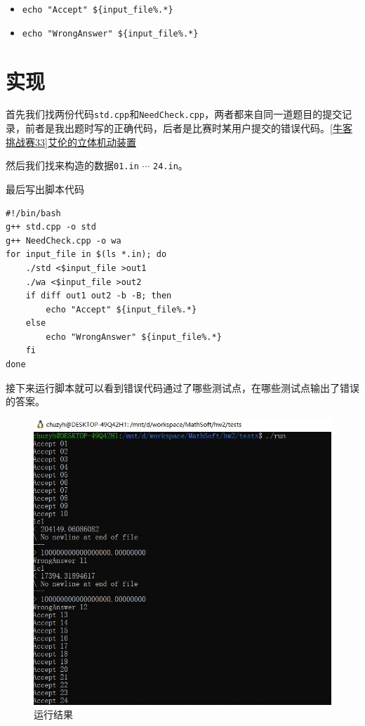 \documentclass{article}
\begin{document}
        \begin{itemize}
            \item \verb|echo "Accept" ${input_file%.*}|
            \item \verb|echo "WrongAnswer" ${input_file%.*}|
        \end{itemize}

\section{实现}
    首先我们找两份代码\verb|std.cpp|和\verb|NeedCheck.cpp|，两者都来自同一道题目的提交记录，前者是我出题时写的正确代码，后者是比赛时某用户提交的错误代码。\href{https://ac.nowcoder.com/acm/contest/1115/C}{[牛客挑战赛33]艾伦的立体机动装置}

    然后我们找来构造的数据\verb|01.in| $\cdots$ \verb|24.in|。

    最后写出脚本代码
\begin{verbatim}
#!/bin/bash
g++ std.cpp -o std
g++ NeedCheck.cpp -o wa
for input_file in $(ls *.in); do
	./std <$input_file >out1
	./wa <$input_file >out2
	if diff out1 out2 -b -B; then
		echo "Accept" ${input_file%.*}
	else 
		echo "WrongAnswer" ${input_file%.*}
	fi
done
\end{verbatim}

    接下来运行脚本就可以看到错误代码通过了哪些测试点，在哪些测试点输出了错误的答案。

    \begin{figure}[H]
        \centering
        \includegraphics[scale=0.8]{result.JPG}
        \caption{运行结果}
      \end{figure}
\end{document}

